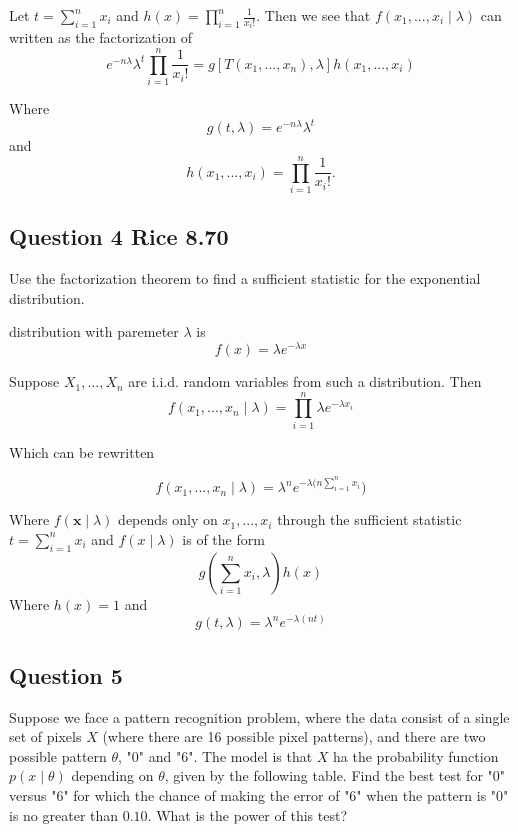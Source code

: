 \documentclass{tufte-book}
\theoremstyle{mytheoremstyle}
\theoremstyle{mylemstyle}
\theoremstyle{mydefstyle}
\begin{document}
\begin{enumerate}
Let $t=\sum_{i=1}^n x_i$ and $h(x)=\prod_{i=1}^n \frac{1}{x_i!}$. Then we see that $f(x_1,...,x_i \mid \lambda)$ can written as the factorization of
\[ e^{-n\lambda} \lambda^t \prod_{i=1}^n \frac{1}{x_i!} = g[T(x_1,...,x_n), \lambda] h(x_1,...,x_i) \]

Where
\[ g(t, \lambda) = e^{-n\lambda} \lambda^t \]
and
\[ h(x_1,...,x_i) = \prod_{i=1}^n \frac{1}{x_i!}. \]

\end{enumerate}

\subsection{Question 4 Rice 8.70}
Use the factorization theorem to find a sufficient statistic for the exponential distribution.

 distribution with paremeter $\lambda$ is
\[ f(x) = \lambda e^{-\lambda x} \]

Suppose $X_1,..., X_n$ are i.i.d. random variables from such a distribution.  Then
\[ f(x_1,...,x_n\mid \lambda) = \prod_{i=1}^n \lambda e^{-\lambda x_i} \]

Which can be rewritten

\[ f(x_1,...,x_n\mid \lambda) = \lambda^n e^{-\lambda (n \sum_{i=1}^n x_i}) \]

Where $f(\mathbf{x}\mid \lambda)$ depends only on $x_1,...,x_i$ through the sufficient statistic $t=\sum_{i=1}^n x_i$ and $f(x \mid \lambda)$ is of the form
\[ g(\sum_{i=1}^n x_i, \lambda) h(x) \]
Where $h(x) = 1$ and
\[ g(t, \lambda) = \lambda^n e^{-\lambda (nt)} \]


\subsection{Question 5}
Suppose we face a pattern recognition problem, where the data consist of a single set of pixels $X$ (where there are 16 possible pixel patterns), and there are two possible pattern $\theta$, "0" and "6".  The model is that $X$ ha the probability function $p(x \mid \theta)$ depending on $\theta$, given by the following table.  Find the best test for "0" versus "6" for which the chance of making the error of "6" when the pattern is "0" is no greater than $0.10$.  What is the power of this test?
\end{document}
